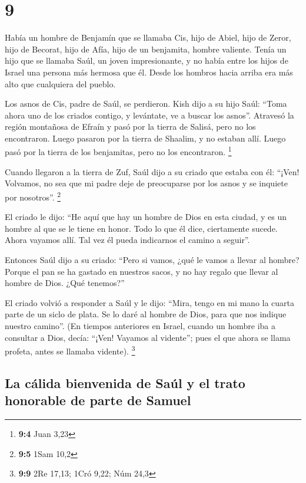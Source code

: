 \hypertarget{section-8}{%
\section{9}\label{section-8}}

 Había un hombre de Benjamín que se llamaba Cis, hijo de
Abiel, hijo de Zeror, hijo de Becorat, hijo de Afía, hijo de un
benjamita, hombre valiente.  Tenía un hijo que se llamaba
Saúl, un joven impresionante, y no había entre los hijos de Israel una
persona más hermosa que él. Desde los hombros hacia arriba era más alto
que cualquiera del pueblo.

 Los asnos de Cis, padre de Saúl, se perdieron. Kish dijo
a su hijo Saúl: ``Toma ahora uno de los criados contigo, y levántate, ve
a buscar los asnos''.  Atravesó la región montañosa de
Efraín y pasó por la tierra de Salisá, pero no los encontraron. Luego
pasaron por la tierra de Shaalim, y no estaban allí. Luego pasó por la
tierra de los benjamitas, pero no los encontraron. \footnote{\textbf{9:4}
  Juan 3,23}

 Cuando llegaron a la tierra de Zuf, Saúl dijo a su criado
que estaba con él: ``¡Ven! Volvamos, no sea que mi padre deje de
preocuparse por los asnos y se inquiete por nosotros''. \footnote{\textbf{9:5}
  1Sam 10,2}

 El criado le dijo: ``He aquí que hay un hombre de Dios en
esta ciudad, y es un hombre al que se le tiene en honor. Todo lo que él
dice, ciertamente sucede. Ahora vayamos allí. Tal vez él pueda
indicarnos el camino a seguir''.

 Entonces Saúl dijo a su criado: ``Pero si vamos, ¿qué le
vamos a llevar al hombre? Porque el pan se ha gastado en nuestros sacos,
y no hay regalo que llevar al hombre de Dios. ¿Qué tenemos?''

 El criado volvió a responder a Saúl y le dijo: ``Mira,
tengo en mi mano la cuarta parte de un siclo de plata. Se lo daré al
hombre de Dios, para que nos indique nuestro camino''. 
(En tiempos anteriores en Israel, cuando un hombre iba a consultar a
Dios, decía: ``¡Ven! Vayamos al vidente''; pues el que ahora se llama
profeta, antes se llamaba vidente). \footnote{\textbf{9:9} 2Re 17,13;
  1Cró 9,22; Núm 24,3}

\hypertarget{la-cuxe1lida-bienvenida-de-sauxfal-y-el-trato-honorable-de-parte-de-samuel}{%
\subsection{La cálida bienvenida de Saúl y el trato honorable de parte
de
Samuel}\label{la-cuxe1lida-bienvenida-de-sauxfal-y-el-trato-honorable-de-parte-de-samuel}}

